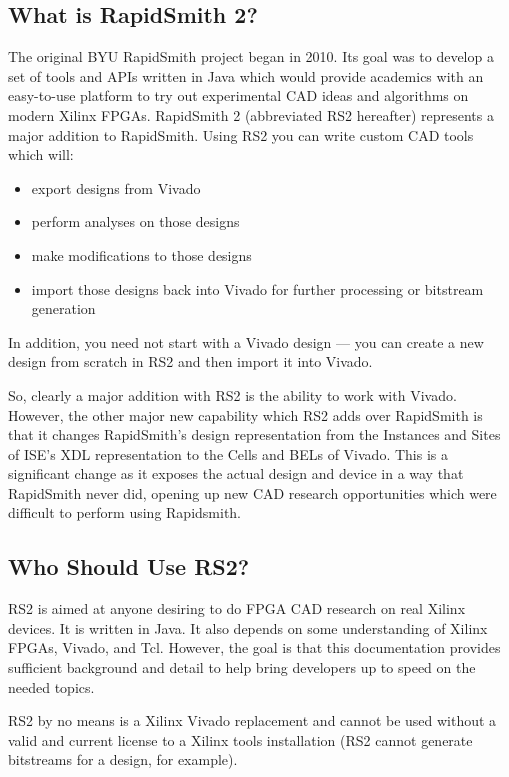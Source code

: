 \documentclass[10pt]{article}
\begin{document}
\subsection{What is RapidSmith 2?}
The original BYU RapidSmith project began in 2010. Its goal was to develop
a set of tools and APIs written in Java which would provide academics with an
easy-to-use platform to try out experimental CAD ideas and algorithms on modern
Xilinx FPGAs.  RapidSmith 2 (abbreviated RS2 hereafter) represents a major
addition to RapidSmith.  Using RS2 you can write custom CAD tools which will:
\begin{itemize}
  \item export designs from Vivado
  \item perform analyses on those designs
  \item make modifications to those designs
  \item import those designs back into Vivado for further processing or bitstream generation
\end{itemize}
In addition, you need not start with a Vivado design --- 
you can create a new design from scratch in RS2 and then import it into Vivado.

So, clearly a major addition with RS2 is the ability to work with Vivado. 
However, the other major new capability which RS2 adds over RapidSmith is that
it changes RapidSmith's design representation from the Instances and Sites of
ISE's XDL representation to the Cells and BELs of Vivado.   This is a
significant change as it exposes the actual design and device in a way that RapidSmith never
did, opening up new CAD research opportunities which were difficult
to perform using Rapidsmith.
       
\subsection{Who Should Use RS2?}
RS2 is aimed at anyone desiring to do FPGA CAD research on real Xilinx devices. 
It is written in Java. It also depends on some understanding of Xilinx FPGAs,
Vivado, and Tcl.  However, the goal is that this documentation provides
sufficient background and detail to help bring developers up to speed on the
needed topics.    

RS2 by no means is a Xilinx Vivado replacement and cannot be used without a
valid and current license to a Xilinx tools installation (RS2 cannot generate
bitstreams for a design, for example).     
\end{document}
